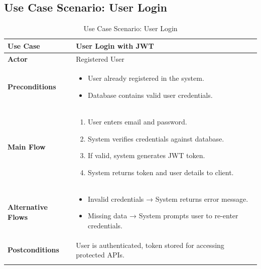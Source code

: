 \subsection{Use Case Scenario: User Login}
\begin{longtable}{|p{3cm}|p{11cm}|}
\hline
\textbf{Use Case} & User Login with JWT \\
\hline
\textbf{Actor} & Registered User \\
\hline
\textbf{Preconditions} & 
\begin{minipage}[t]{10cm}
\begin{itemize}
    \item User already registered in the system.
    \item Database contains valid user credentials.
\end{itemize}
\end{minipage} \\
\hline
\textbf{Main Flow} &
\begin{minipage}[t]{10cm}
\begin{enumerate}
    \item User enters email and password.
    \item System verifies credentials against database.
    \item If valid, system generates JWT token.
    \item System returns token and user details to client.
\end{enumerate}
\end{minipage} \\
\hline
\textbf{Alternative Flows} &
\begin{minipage}[t]{10cm}
\begin{itemize}
    \item Invalid credentials → System returns error message.
    \item Missing data → System prompts user to re-enter credentials.
\end{itemize}
\end{minipage} \\
\hline
\textbf{Postconditions} & 
\begin{minipage}[t]{10cm}
User is authenticated, token stored for accessing protected APIs.
\end{minipage} \\
\hline
\caption{Use Case Scenario: User Login}
\label{tab:usecase_login}
\end{longtable}
